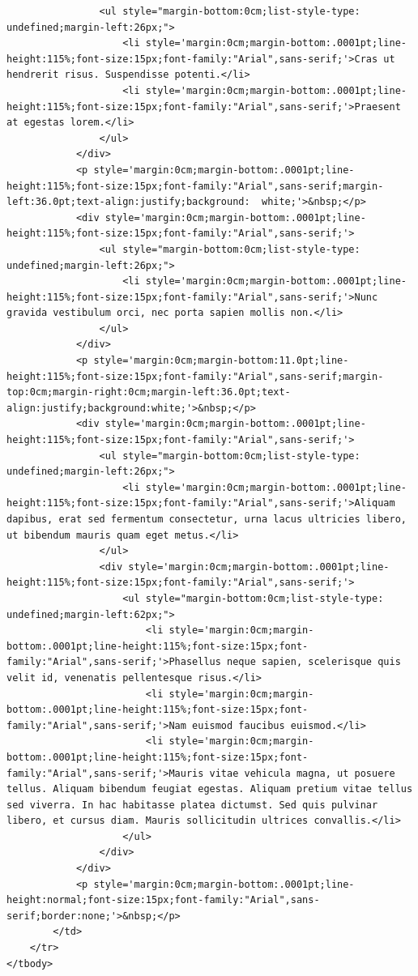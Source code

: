 \documentclass[
]{book}
\begin{document}
\begin{verbatim}
                <ul style="margin-bottom:0cm;list-style-type: undefined;margin-left:26px;">
                    <li style='margin:0cm;margin-bottom:.0001pt;line-height:115%;font-size:15px;font-family:"Arial",sans-serif;'>Cras ut hendrerit risus. Suspendisse potenti.</li>
                    <li style='margin:0cm;margin-bottom:.0001pt;line-height:115%;font-size:15px;font-family:"Arial",sans-serif;'>Praesent at egestas lorem.</li>
                </ul>
            </div>
            <p style='margin:0cm;margin-bottom:.0001pt;line-height:115%;font-size:15px;font-family:"Arial",sans-serif;margin-left:36.0pt;text-align:justify;background:  white;'>&nbsp;</p>
            <div style='margin:0cm;margin-bottom:.0001pt;line-height:115%;font-size:15px;font-family:"Arial",sans-serif;'>
                <ul style="margin-bottom:0cm;list-style-type: undefined;margin-left:26px;">
                    <li style='margin:0cm;margin-bottom:.0001pt;line-height:115%;font-size:15px;font-family:"Arial",sans-serif;'>Nunc gravida vestibulum orci, nec porta sapien mollis non.</li>
                </ul>
            </div>
            <p style='margin:0cm;margin-bottom:11.0pt;line-height:115%;font-size:15px;font-family:"Arial",sans-serif;margin-top:0cm;margin-right:0cm;margin-left:36.0pt;text-align:justify;background:white;'>&nbsp;</p>
            <div style='margin:0cm;margin-bottom:.0001pt;line-height:115%;font-size:15px;font-family:"Arial",sans-serif;'>
                <ul style="margin-bottom:0cm;list-style-type: undefined;margin-left:26px;">
                    <li style='margin:0cm;margin-bottom:.0001pt;line-height:115%;font-size:15px;font-family:"Arial",sans-serif;'>Aliquam dapibus, erat sed fermentum consectetur, urna lacus ultricies libero, ut bibendum mauris quam eget metus.</li>
                </ul>
                <div style='margin:0cm;margin-bottom:.0001pt;line-height:115%;font-size:15px;font-family:"Arial",sans-serif;'>
                    <ul style="margin-bottom:0cm;list-style-type: undefined;margin-left:62px;">
                        <li style='margin:0cm;margin-bottom:.0001pt;line-height:115%;font-size:15px;font-family:"Arial",sans-serif;'>Phasellus neque sapien, scelerisque quis velit id, venenatis pellentesque risus.</li>
                        <li style='margin:0cm;margin-bottom:.0001pt;line-height:115%;font-size:15px;font-family:"Arial",sans-serif;'>Nam euismod faucibus euismod.</li>
                        <li style='margin:0cm;margin-bottom:.0001pt;line-height:115%;font-size:15px;font-family:"Arial",sans-serif;'>Mauris vitae vehicula magna, ut posuere tellus. Aliquam bibendum feugiat egestas. Aliquam pretium vitae tellus sed viverra. In hac habitasse platea dictumst. Sed quis pulvinar libero, et cursus diam. Mauris sollicitudin ultrices convallis.</li>
                    </ul>
                </div>
            </div>
            <p style='margin:0cm;margin-bottom:.0001pt;line-height:normal;font-size:15px;font-family:"Arial",sans-serif;border:none;'>&nbsp;</p>
        </td>
    </tr>
</tbody>
\end{verbatim}
\end{document}
